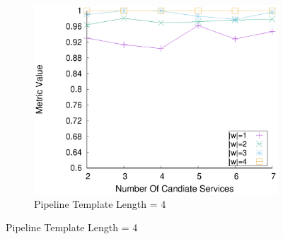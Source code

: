 \begin{figure}[ht!]
\begin{subfigure}{0.49\textwidth}
        \label{fig:quality_window_average_perce_n3}
      \end{subfigure}
      \hfill
      \begin{subfigure}{0.49\textwidth}
        \includegraphics[width=\textwidth]{Images/graphs/window_quality_performance_diff_perce_n7_s7_50_89_n4}
        \caption{Pipeline Template Length = 4}


\end{subfigure}
\end{figure}
